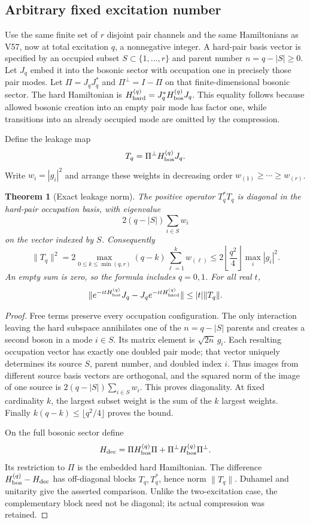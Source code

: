\documentclass[11pt]{article}
\newtheorem{theorem}{Theorem}[section]
\theoremstyle{remark}
\begin{document}
\subsection{Arbitrary fixed excitation number}

Use the same finite set of \(r\) disjoint pair channels and the
same Hamiltonians as V57, now at total excitation \(q\), a
nonnegative integer.  A hard-pair basis vector is specified by
an occupied subset \(S\subset\{1,\ldots,r\}\) and parent number
\(n=q-|S|\geq0\).  Let \(J_q\) embed it into the bosonic
sector with occupation one in precisely those pair modes.
Let \(\Pi=J_qJ_q^*\) and \(\Pi^\perp=I-\Pi\) on that
finite-dimensional bosonic sector.  The hard Hamiltonian is
\(H_{\rm hard}^{(q)}=J_q^*H_{\rm bos}^{(q)}J_q\).
This equality follows because allowed bosonic creation into
an empty pair mode has factor one, while transitions into
an already occupied mode are omitted by the compression.

Define the leakage map
\[
 T_q=\Pi^\perp H_{\rm bos}^{(q)}J_q .
\]
Write \(w_i=|g_i|^2\) and arrange these weights in decreasing
order \(w_{(1)}\geq\cdots\geq w_{(r)}\).

\begin{theorem}[Exact leakage norm]
\label{thm:v20v58-leakage}
The positive operator \(T_q^*T_q\) is diagonal in the
hard-pair occupation basis, with eigenvalue
\[
 2(q-|S|)\sum_{i\in S}w_i
\]
on the vector indexed by \(S\).  Consequently
\[
 \|T_q\|^2=
 2\max_{0\leq k\leq\min(q,r)}
              (q-k)\sum_{\ell=1}^k w_{(\ell)}
 \leq 2\left\lfloor\frac{q^2}{4}\right\rfloor
                  \max_i|g_i|^2 .
\]
An empty sum is zero, so the formula includes \(q=0,1\).
For all real \(t\),
\[
 \|e^{-itH_{\rm bos}^{(q)}}J_q
       -J_qe^{-itH_{\rm hard}^{(q)}}\|
                   \leq |t|\|T_q\|.
\]
\end{theorem}
\begin{proof}
Free terms preserve every occupation configuration.
The only interaction leaving the hard subspace annihilates
one of the \(n=q-|S|\) parents and creates a second boson
in a mode \(i\in S\).  Its matrix element is
\(\sqrt{2n}\,g_i\).
Each resulting occupation vector has exactly one doubled
pair mode; that vector uniquely determines its source
\(S\), parent number, and doubled index \(i\).
Thus images from different source basis vectors are
orthogonal, and the squared norm of the image of one
source is \(2(q-|S|)\sum_{i\in S}w_i\).
This proves diagonality.  At fixed cardinality \(k\),
the largest subset weight is the sum of the \(k\)
largest weights.  Finally \(k(q-k)\leq\lfloor q^2/4\rfloor\)
proves the bound.

On the full bosonic sector define
\[
 H_{\rm dec}=
       \Pi H_{\rm bos}^{(q)}\Pi+
       \Pi^\perp H_{\rm bos}^{(q)}\Pi^\perp .
\]
Its restriction to \(\Pi\) is the embedded hard Hamiltonian.
The difference \(H_{\rm bos}^{(q)}-H_{\rm dec}\) has
off-diagonal blocks \(T_q,T_q^*\), hence norm \(\|T_q\|\).
Duhamel and unitarity give the asserted comparison.
Unlike the two-excitation case, the complementary block
need not be diagonal; its actual compression was retained.
\end{proof}
\end{document}

